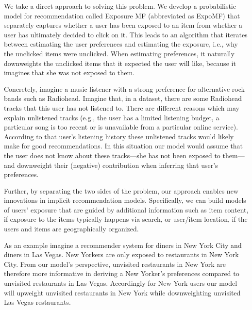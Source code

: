 We take a direct approach to solving this problem.  We
develop a probabilistic model for recommendation called Exposure MF
(abbreviated as ExpoMF) that separately captures whether a user has been exposed to an item from
whether a user has ultimately decided to click on it.  This leads to an
algorithm that iterates between estimating the user preferences and
estimating the exposure, i.e., why the unclicked items were unclicked.
When estimating preferences, it naturally downweights the unclicked items
that it expected the user will like, because it imagines that she was not
exposed to them. 

Concretely, imagine a music listener with a strong preference for alternative
rock bands such as Radiohead. Imagine that, in a dataset, there are some
Radiohead tracks that this user has not listened to. There are different
reasons which may explain unlistened tracks  (e.g., the user has a limited
listening budget, a particular song is too recent or is unavailable from a
particular online service). According to that user's listening history these
unlistened tracks would likely make for good recommendations. In this situation
our model would assume that the user does not know about these tracks---she has
not been exposed to them---and downweight their (negative) contribution when
inferring that user's preferences.

Further, by separating the two sides of the problem, our approach
enables new innovations in implicit recommendation
models. Specifically, we can build models of users' exposure that
are guided by additional information such as item content, if
exposure to the items typically happens via search, or user/item
location, if the users and items are geographically organized. 

As an example imagine a recommender system for diners in New York City and
diners in Las Vegas. New Yorkers are only exposed to restaurants in New York City.
From our model's perspective, unvisited restaurants in New York are therefore more 
informative in deriving a New Yorker's preferences compared to unvisited 
restaurants in Las Vegas. Accordingly for New York users our model will
upweight unvisited restaurants in New York while downweighting unvisited
Las Vegas restaurants. 


